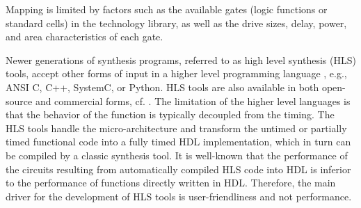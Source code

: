 Mapping is limited by factors such as the available gates (logic functions or standard cells) in the technology library, as well as the drive sizes, delay, power, and area characteristics of each gate.

Newer generations of synthesis programs, referred to as high level synthesis (HLS) tools, accept other forms of input in a higher level programming language \cite{Chapter:Zhang2008,ICCD:Chu89,TCAD:Corazao2006}, e.g., ANSI C, C++, SystemC, or Python.
HLS tools are also available in both open-source and commercial forms, cf. \cite{tool:Vivado,tool:MyHDL,tool:PandA}.
The limitation of the higher level languages is that the behavior of the function is typically decoupled from the timing.
The HLS tools handle the micro-architecture and transform the untimed or partially timed functional code into a fully timed HDL implementation, which in turn can be compiled by a classic synthesis tool.
It is well-known that the performance of the circuits resulting from automatically compiled HLS code into HDL is inferior to the performance of functions directly written in HDL.
Therefore, the main driver for the development of HLS tools is user-friendliness and not performance.
